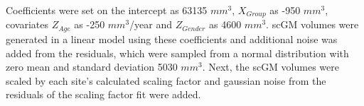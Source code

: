 Coefficients were set on the intercept as 63135 $mm^3$, $X_{Group}$ as -950 $mm^3$, covariates $Z_{Age}$ as -250 $mm^3$/year and $Z_{Gender}$ as 4600 $mm^3$. scGM volumes were generated in a linear model using these coefficients and additional noise was added from the  residuals, which were sampled from a normal distribution with zero mean and standard deviation 5030 $mm^3$. Next, the scGM volumes were scaled by each site's calculated scaling factor and gaussian noise from the residuals of the scaling factor fit were added.